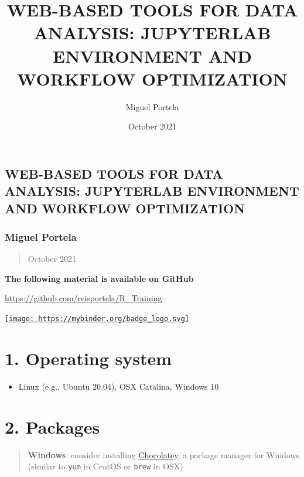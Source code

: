 \documentclass[
  12pt,
]{article}
\title{WEB-BASED TOOLS FOR DATA ANALYSIS: JUPYTERLAB ENVIRONMENT AND
WORKFLOW OPTIMIZATION}
\author{Miguel Portela}
\date{October 2021}
\providecommand{\tightlist}{%
  \setlength{\itemsep}{0pt}\setlength{\parskip}{0pt}}
\begin{document}
\maketitle

\hypertarget{web-based-tools-for-data-analysis-jupyterlab-environment-and-workflow-optimization}{%
\subsection{WEB-BASED TOOLS FOR DATA ANALYSIS: JUPYTERLAB ENVIRONMENT
AND WORKFLOW
OPTIMIZATION}\label{web-based-tools-for-data-analysis-jupyterlab-environment-and-workflow-optimization}}

\hypertarget{miguel-portela}{%
\subsubsection{Miguel Portela}\label{miguel-portela}}

\begin{quote}
October 2021
\end{quote}

\textbf{The following material is available on GitHub}

\url{https://github.com/reisportela/R_Training}

\href{https://mybinder.org/v2/gh/reisportela/R_Training/HEAD?urlpath=lab}{\texttt{[image: https://mybinder.org/badge\_logo.svg]}}

\hypertarget{operating-system}{%
\section{1. Operating system}\label{operating-system}}

\begin{itemize}
\tightlist
\item
  Linux (e.g., Ubuntu 20.04), OSX Catalina, Windows 10
\end{itemize}

\hypertarget{packages}{%
\section{2. Packages}\label{packages}}

\begin{quote}
\textbf{Windows}: consider installing
\href{https://chocolatey.org/}{Chocolatey}, a package manager for
Windows (similar to \texttt{yum} in CentOS or \texttt{brew} in OSX)
\end{quote}
\end{document}
